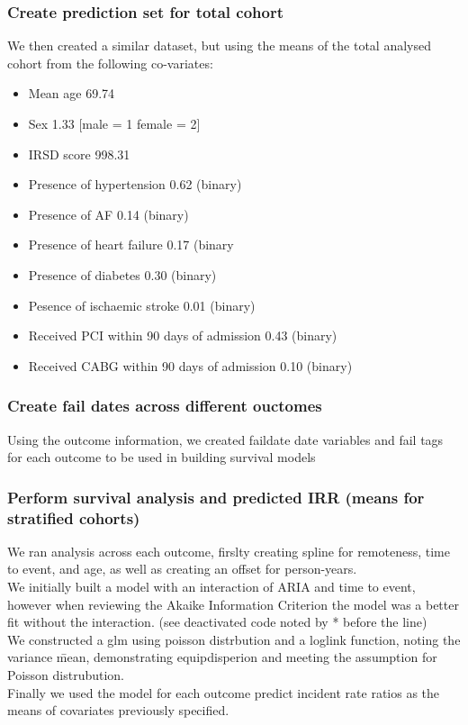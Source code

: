 \documentclass[11pt]{article}
\begin{document}
\color{violet}
\begin{stlog}\end{stlog}
\color{black}
\subsubsection{Create prediction set for total cohort}
We then created a similar dataset, but using the means of the total analysed cohort from the following co-variates:
\begin{itemize}
\item Mean age 69.74
\item Sex 1.33 [male = 1 female = 2]
\item IRSD score 998.31
\item Presence of hypertension 0.62 (binary)
\item Presence of AF 0.14 (binary)
\item Presence of heart failure 0.17 (binary
\item Presence of diabetes 0.30 (binary)
\item Pesence of ischaemic stroke 0.01 (binary)
\item Received PCI within 90 days of admission 0.43 (binary)
\item Received CABG within 90 days of admission 0.10 (binary)
\end{itemize}
\color{violet}
\begin{stlog}\end{stlog}
\color{black}
\subsubsection{Create fail dates across different ouctomes}
Using the outcome information, we created faildate date variables and fail tags for each outcome to be used in building survival models
\color{violet}
\begin{stlog}\end{stlog}
\color{black}
\subsubsection{Perform survival analysis and predicted IRR (means for stratified cohorts)}
We ran analysis across each outcome, firslty creating spline for remoteness, time to event, and age, as well as creating an offset for person-years. \\
We initially built a model with an interaction of ARIA and time to event, however when reviewing the Akaike Information Criterion the model was a better fit without the interaction. (see deactivated code noted by * before the line)\\
We constructed a glm using poisson distrbution and a loglink function, noting the variance \= mean, demonstrating equipdisperion and meeting the assumption for Poisson distrubution. \\
Finally we used the model for each outcome predict incident rate ratios as the means of covariates previously specified. 
\color{violet}
\begin{stlog}\end{stlog}
\color{black}
\end{document}
